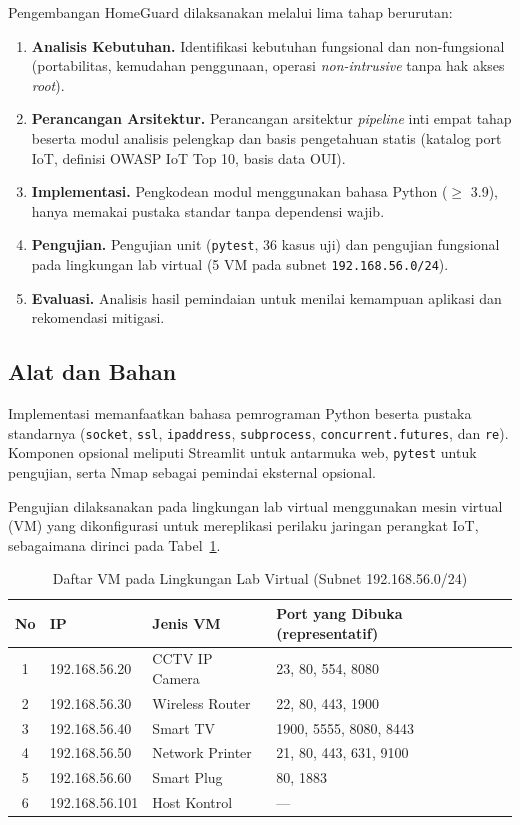 \documentclass[conference]{IEEEtran}
\begin{document}
Pengembangan HomeGuard dilaksanakan melalui lima tahap berurutan:
\begin{enumerate}
    \item \textbf{Analisis Kebutuhan.} Identifikasi kebutuhan fungsional dan non-fungsional (portabilitas, kemudahan penggunaan, operasi \textit{non-intrusive} tanpa hak akses \textit{root}).
    \item \textbf{Perancangan Arsitektur.} Perancangan arsitektur \textit{pipeline} inti empat tahap beserta modul analisis pelengkap dan basis pengetahuan statis (katalog port IoT, definisi OWASP IoT Top 10, basis data OUI).
    \item \textbf{Implementasi.} Pengkodean modul menggunakan bahasa Python ($\geq$ 3.9), hanya memakai pustaka standar tanpa dependensi wajib.
    \item \textbf{Pengujian.} Pengujian unit (\texttt{pytest}, 36 kasus uji) dan pengujian fungsional pada lingkungan lab virtual (5 VM pada subnet \texttt{192.168.56.0/24}).
    \item \textbf{Evaluasi.} Analisis hasil pemindaian untuk menilai kemampuan aplikasi dan rekomendasi mitigasi.
\end{enumerate}

\subsection{Alat dan Bahan}

Implementasi memanfaatkan bahasa pemrograman Python beserta pustaka standarnya (\texttt{socket}, \texttt{ssl}, \texttt{ipaddress}, \texttt{subprocess}, \texttt{concurrent.futures}, dan \texttt{re}). Komponen opsional meliputi Streamlit untuk antarmuka web, \texttt{pytest} untuk pengujian, serta Nmap sebagai pemindai eksternal opsional.

Pengujian dilaksanakan pada lingkungan lab virtual menggunakan mesin virtual (VM) yang dikonfigurasi untuk mereplikasi perilaku jaringan perangkat IoT, sebagaimana dirinci pada Tabel\ \ref{tab:device_list}.

\begin{table}[htbp]
\caption{Daftar VM pada Lingkungan Lab Virtual (Subnet 192.168.56.0/24)}
\label{tab:device_list}
\renewcommand{\arraystretch}{1.2}
\begin{tabularx}{\columnwidth}{|c|l|l|X|}
\hline
\textbf{No} & \textbf{IP} & \textbf{Jenis VM} & \textbf{Port yang Dibuka (representatif)} \\
\hline
1 & 192.168.56.20 & CCTV IP Camera & 23, 80, 554, 8080 \\
\hline
2 & 192.168.56.30 & Wireless Router & 22, 80, 443, 1900 \\
\hline
3 & 192.168.56.40 & Smart TV       & 1900, 5555, 8080, 8443 \\
\hline
4 & 192.168.56.50 & Network Printer & 21, 80, 443, 631, 9100 \\
\hline
5 & 192.168.56.60 & Smart Plug     & 80, 1883 \\
\hline
6 & 192.168.56.101 & Host Kontrol  & --- \\
\hline
\end{tabularx}
\end{table}
\end{document}
